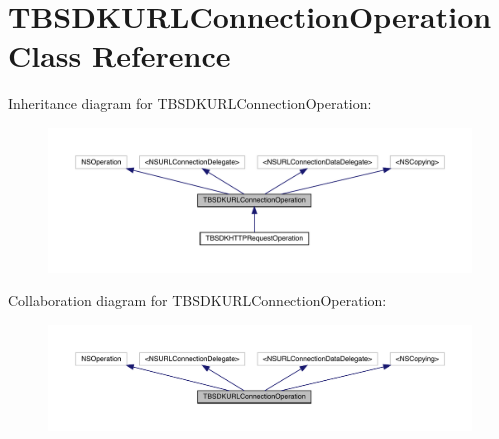 \hypertarget{interface_t_b_s_d_k_u_r_l_connection_operation}{}\section{T\+B\+S\+D\+K\+U\+R\+L\+Connection\+Operation Class Reference}
\label{interface_t_b_s_d_k_u_r_l_connection_operation}


Inheritance diagram for T\+B\+S\+D\+K\+U\+R\+L\+Connection\+Operation\+:\nopagebreak
\begin{figure}[H]
\begin{center}
\leavevmode
\includegraphics[width=350pt]{interface_t_b_s_d_k_u_r_l_connection_operation__inherit__graph}
\end{center}
\end{figure}


Collaboration diagram for T\+B\+S\+D\+K\+U\+R\+L\+Connection\+Operation\+:\nopagebreak
\begin{figure}[H]
\begin{center}
\leavevmode
\includegraphics[width=350pt]{interface_t_b_s_d_k_u_r_l_connection_operation__coll__graph}
\end{center}
\end{figure}
